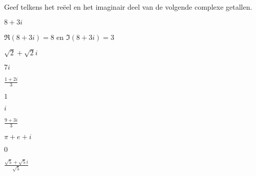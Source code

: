 \documentclass{ximera}
\begin{document}
\begin{exercise} Geef telkens  het reëel en het imaginair deel van de volgende complexe getallen.
	\begin{xmmulticols}
	\begin{question}
		\(8+3i\)
		\begin{oplossing} \(\Re(8+3i) = 8\) en \(\Im(8+3i) = 3\)\end{oplossing}
	\end{question}
	
	\begin{question}
		\(\sqrt{2} + \sqrt{2}i\)
	\end{question}
	\begin{question}
		\(7i\)
	\end{question}
	\begin{question}
		\(\frac{1+2i}{3}\)
	\end{question}
	\begin{question}
		\(1\)
	\end{question}
	\begin{question}
	\(i\)
	\end{question}
	\begin{question}
		\(\frac{9+3i}{3}\)
	\end{question}
	\begin{question}
		\(\pi + e + i \)
	\end{question}
	\begin{question}
		\(0\)
	\end{question}
	\begin{question}
		\(\frac{\sqrt{5} + \sqrt{5}i }{\sqrt{5}}\)
	\end{question}
	
	\end{xmmulticols}
	
\end{exercise}
	
\end{document}
